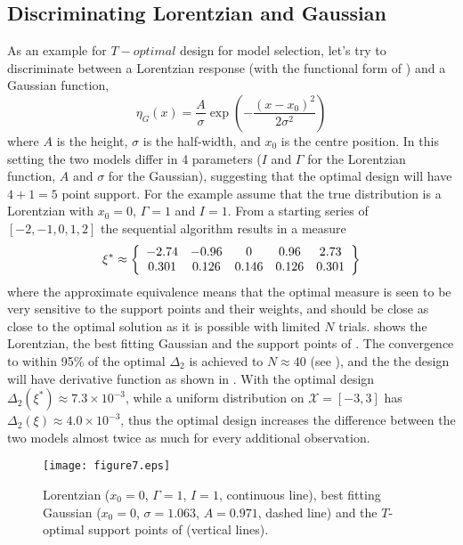 \documentclass[12pt]{iopart}
\begin{document}
\subsection{Discriminating Lorentzian and Gaussian}

As an example for $T-optimal$ design for model selection, let's try to discriminate between a Lorentzian response (with the functional form of ) and a Gaussian function,
\begin{equation}
\eta_G(x) = \frac{A}{\sigma} \exp\left(-\frac{(x-x_0)^2}{2 \sigma^2}\right)
\label{eq:gauss}
\end{equation}
where $A$ is the height, $\sigma$ is the half-width, and $x_0$ is the centre position. In this setting the two models differ in 4 parameters ($I$ and $\Gamma$ for the Lorentzian function, $A$ and $\sigma$ for the Gaussian), suggesting that the optimal design will have $4+1=5$ point support. For the example assume that the true distribution is a Lorentzian with $x_0 = 0$, $\Gamma = 1$  and $I = 1$. From a starting series of $[-2, -1, 0, 1, 2]$ the sequential algorithm results in a measure
\begin{equation}
\xi^* \approx \left\{
  \begin{array}{c c c c c}
    -2.74 & -0.96 & 0 & 0.96 & 2.73\\
    0.301 & 0.126 & 0.146 & 0.126 & 0.301\\
  \end{array} \right \}
\label{eq:lorgauss}
\end{equation}
where the approximate equivalence means that the optimal measure is seen to be very sensitive to the support points and their weights, and  should be close as close to the optimal solution as it is possible with limited $N$ trials.  shows the Lorentzian, the best fitting Gaussian and the support points of . The convergence to within 95\% of the optimal $\Delta_2$ is achieved to $N \approx 40$ (see ), and the the design will have derivative function as shown in .
With the optimal design $\Delta_2(\xi^*) \approx 7.3 \times 10^{-3}$, while a uniform distribution on $\mathcal{X} = [-3, 3]$ has $\Delta_2(\xi) \approx 4.0 \times 10^{-3}$, thus the optimal design increases the difference between the two models almost twice as much for every additional observation.

\begin{figure}
\texttt{[image: figure7.eps]}
\caption{Lorentzian ($x_0 = 0$, $\Gamma = 1$, $I = 1$, continuous line), best fitting Gaussian ($x_0 = 0$, $\sigma = 1.063$, $A = 0.971$, dashed line) and the $T$-optimal support points of  (vertical lines).}
\label{fig:lorgauss}
\end{figure}
\end{document}
